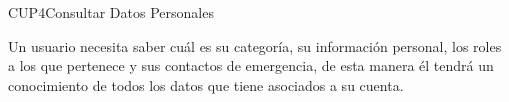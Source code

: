 \begin{UseCase}{CUP4}{Consultar Datos Personales}
    {

    	Un usuario necesita saber cuál es su categoría, su información personal, los roles a los que pertenece y sus contactos de emergencia, de esta manera él tendrá un conocimiento de todos los datos que tiene asociados a su cuenta.

    }


\end{UseCase}
